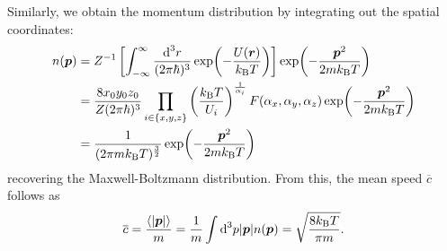 \pagebreak
\noindent
Similarly, we obtain the momentum distribution by integrating out the spatial coordinates:
\begin{align}
    n(\boldsymbol{p}) &= Z^{-1} \left[\int_{-\infty}^\infty \frac{\text{d}^{3}r}{(2\pi\hbar)^3} \exp\!\left(-\frac{U(\boldsymbol{r})}{k_\text{B} T}\right) \right]\exp\!\left(-\frac{\boldsymbol{p}^2}{2mk_\text{B} T}\right)\nonumber \\
    &= \frac{8x_0y_0z_0}{Z(2\pi\hbar)^3} \prod_{i\in\{x,y,z\}} \left(\frac{k_\text{B} T}{U_i}\right)^{\frac{1}{\alpha_i}} F(\alpha_x,\alpha_y,\alpha_z) \exp\!\left(-\frac{\boldsymbol{p}^2}{2mk_\text{B} T}\right) \nonumber \\
    &= \frac{1}{(2\pi m k_\text{B} T)^\frac{3}{2}} \exp\!\left(-\frac{\boldsymbol{p}^2}{2mk_\text{B} T}\right) \nonumber
\end{align}
recovering the Maxwell-Boltzmann distribution.
From this, the mean speed $\overline{c}$ follows as
\begin{equation}
    \overline{c} = \frac{\langle |\boldsymbol{p}| \rangle}{m} = \frac{1}{m}\int \text{d}^{3}p |\boldsymbol{p}|n(\boldsymbol{p}) = \sqrt{\frac{8k_\text{B} T}{\pi m}}.
\end{equation}

